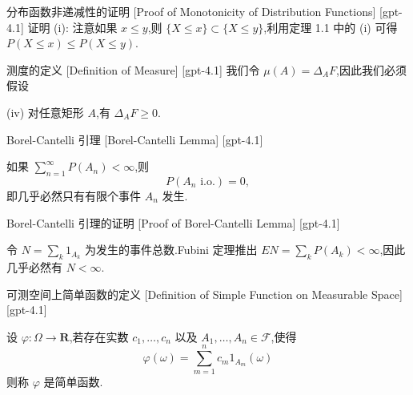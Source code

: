 \documentclass[UTF8]{ctexart}
\begin{document}
    
    
    \begin{prf}
        {分布函数非递减性的证明}
        [Proof of Monotonicity of Distribution Functions]
        [gpt-4.1]
        证明 (i): 注意如果 $x \leq y$,则 $\{X \leq x\} \subset \{X \leq y\}$,利用定理 1.1 中的 (i) 可得 $P(X \leq x) \leq P(X \leq y)$.
    \end{prf}
    
    
    
    \begin{dfn}
        {测度的定义}
        [Definition of Measure]
        [gpt-4.1]
        我们令 $\mu ( A ) = \Delta _ { A } F$,因此我们必须假设

(iv) 对任意矩形 $A$,有 $\Delta _ { A } F \ge 0$.
    \end{dfn}
    
    
    
    \begin{thm}
        {Borel-Cantelli 引理}
        [Borel-Cantelli Lemma]
        [gpt-4.1]
        
如果 $\sum_{n=1}^{\infty} P(A_{n}) < \infty$,则
\[
P(A_{n} \text{ i.o.}) = 0,
\]
即几乎必然只有有限个事件 $A_n$ 发生.

    \end{thm}
    
    
    
    \begin{prf}
        {Borel-Cantelli 引理的证明}
        [Proof of Borel-Cantelli Lemma]
        [gpt-4.1]
        
令 $N = \sum_{k} 1_{A_{k}}$ 为发生的事件总数.Fubini 定理推出 $EN = \sum_{k} P(A_{k}) < \infty$,因此几乎必然有 $N < \infty$.

    \end{prf}
    
    
    
    \begin{dfn}
        {可测空间上简单函数的定义}
        [Definition of Simple Function on Measurable Space]
        [gpt-4.1]
        
设 $\varphi : \Omega \to \mathbf{R}$,若存在实数 $c_1, \ldots, c_n$ 以及 $A_1, \ldots, A_n \in \mathcal{F}$,使得
\[
\varphi(\omega) = \sum_{m=1}^n c_m 1_{A_m}(\omega)
\]
则称 $\varphi$ 是简单函数.

    \end{dfn}
    
\end{document}
